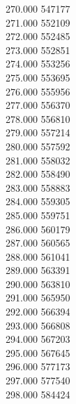 { 270.000	547177 \\
 271.000	552109 \\
 272.000	552485 \\
 273.000	552851 \\
 274.000	553256 \\
 275.000	553695 \\
 276.000	555956 \\
 277.000	556370 \\
 278.000	556810 \\
 279.000	557214 \\
 280.000	557592 \\
 281.000	558032 \\
 282.000	558490 \\
 283.000	558883 \\
 284.000	559305 \\
 285.000	559751 \\
 286.000	560179 \\
 287.000	560565 \\
 288.000	561041 \\
 289.000	563391 \\
 290.000	563810 \\
 291.000	565950 \\
 292.000	566394 \\
 293.000	566808 \\
 294.000	567203 \\
 295.000	567645 \\
 296.000	577173 \\
 297.000	577540 \\
 298.000	584424 \\
}
